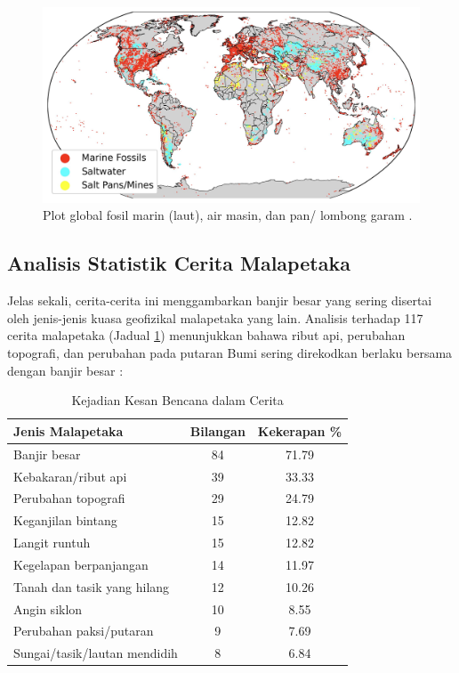 \documentclass[10pt,twocolumn,letterpaper]{article}
\begin{document}
\begin{figure}[b]
\begin{center}
\includegraphics[width=1\textwidth]{marine.jpg}
\end{center}
   \caption{Plot global fosil marin (laut), air masin, dan pan/ lombong garam \cite{15,16,86,87}.}
   \label{fig:2}
\end{figure}

\subsection{Analisis Statistik Cerita Malapetaka}

Jelas sekali, cerita-cerita ini menggambarkan banjir besar yang sering disertai oleh jenis-jenis kuasa geofizikal malapetaka yang lain. Analisis terhadap 117 cerita malapetaka (Jadual \ref{tab: 1}) menunjukkan bahawa ribut api, perubahan topografi, dan perubahan pada putaran Bumi sering direkodkan berlaku bersama dengan banjir besar \cite{14}:

\begin{table}[ht]
\begin{center}
\renewcommand{\arraystretch}{1.2}  %
\begin{tabular}{|l|c|c|}
\hline
\textbf{Jenis Malapetaka} & \textbf{Bilangan} & \textbf{Kekerapan \%} \\
\hline\hline
Banjir besar              & 84 & 71.79 \\
Kebakaran/ribut api       & 39 & 33.33 \\
Perubahan topografi       & 29 & 24.79 \\
Keganjilan bintang     & 15 & 12.82 \\
Langit runtuh           & 15 & 12.82 \\
Kegelapan berpanjangan      & 14 & 11.97 \\
Tanah dan tasik yang hilang    & 12 & 10.26 \\
Angin siklon          & 10 & 8.55  \\
Perubahan paksi/putaran & 9 & 7.69  \\
Sungai/tasik/lautan mendidih & 8 & 6.84 \\
\hline
\end{tabular}
\end{center}
\caption{Kejadian Kesan Bencana dalam Cerita}
\label{tab: 1}
\end{table}
\end{document}
